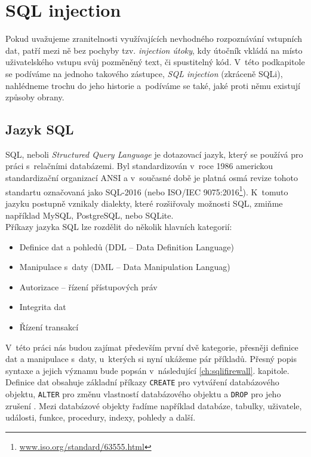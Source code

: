 \section{SQL injection} \label{sec:3:sqli}
Pokud uvažujeme zranitelnosti využívajících nevhodného rozpoznávání vstupních dat, patří mezi ně bez pochyby tzv. \textit{injection útoky}, kdy 
útočník vkládá na místo uživatelského vstupu svůj pozměněný text, či spustitelný kód. V~této podkapitole se podíváme na jednoho 
takového zástupce, \textit{SQL injection} (zkráceně SQLi), nahlédneme trochu do jeho historie a~podíváme se také, jaké proti němu existují způsoby obrany. 

\subsection{Jazyk SQL} \label{subsec:3:sql}
SQL, neboli \textit{Structured Query Language} je dotazovací jazyk, který se používá pro práci s~relačními databázemi. Byl standardizován 
v~roce 1986 americkou standardizační organizací ANSI a v~současné době je platná osmá revize tohoto standartu označovaná jako SQL-2016 
(nebo ISO/IEC 9075:2016\footnote{\url{www.iso.org/standard/63555.html}}). K~tomuto jazyku postupně vznikaly dialekty, které rozšiřovaly
možnosti SQL, zmiňme například MySQL, PostgreSQL, nebo SQLite.\\

Příkazy jazyka SQL lze rozdělit do několik hlavních kategorií:
\begin{itemize}
\item Definice dat a pohledů (DDL -- Data Definition Language)
\item Manipulace s~daty (DML -- Data Manipulation Languag)
\item Autorizace -- řízení přístupových práv
\item Integrita dat 
\item Řízení transakcí \cite[str. 6]{ZendulkaIDS}
\end{itemize} 
\vspace*{\baselineskip}
V~této práci nás budou zajímat především první dvě kategorie, přesněji definice dat a manipulace s~daty, u~kterých si nyní ukážeme pár příkladů.
Přesný popis syntaxe a jejich významu bude popsán v~následující \ref{ch:sqlifirewall}. kapitole. \\

\Bat{} Definice dat obsahuje základní příkazy \texttt{CREATE} pro vytváření databázového objektu, \texttt{ALTER} 
pro změnu vlastností databázového objektu a \texttt{DROP} pro jeho zrušení \cite[str. 7]{ZendulkaIDS}.
Mezi databázové objekty řadíme například databáze, tabulky, uživatele, události, funkce, procedury, indexy, pohledy a další. \\


